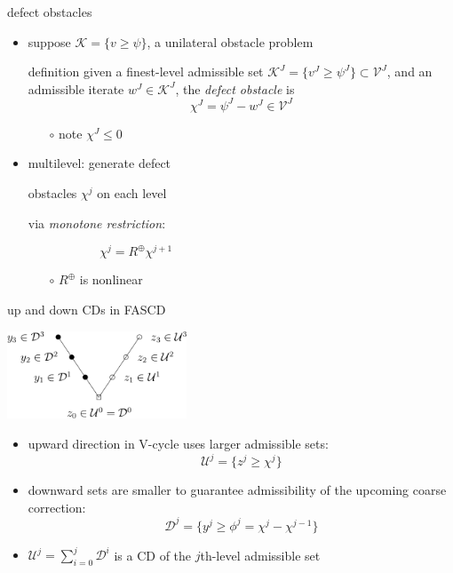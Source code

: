\documentclass[svgnames,
               hyperref={colorlinks,citecolor=DeepPink4,linkcolor=FireBrick,urlcolor=Maroon},
               usepdftitle=false]  %
               {beamer}
\newcommand{\ds}{\displaystyle}
\begin{document}
\begin{frame}{defect obstacles}

\begin{itemize}
\item suppose $\mathcal{K} = \{v \ge \psi\}$, a unilateral obstacle problem
\begin{block}{definition}
given a finest-level admissible set $\mathcal{K}^J = \{v^J\ge \psi^J\} \subset \mathcal{V}^J$, and an admissible iterate $w^J \in \mathcal{K}^J$, the \emph{defect obstacle} is
    $$\chi^J = \psi^J - w^J \in \mathcal{V}^J$$
\end{block}

    \begin{itemize}
    \item[$\circ$] note $\chi^J \le 0$
    \end{itemize}
\item multilevel: generate defect

obstacles $\chi^j$ on each level

 via \emph{monotone restriction}:

$$\chi^j = R^{\oplus} \chi^{j+1} \phantom{smdlfkaj asdfklj asdf sdfaa asddfas dsa}$$

    \begin{itemize}
    \item[$\circ$] $R^{\oplus}$ is nonlinear
    \end{itemize}
\end{itemize}

\vspace{-25mm}
\hfill \mbox{}
\end{frame}


\begin{frame}{up and down CDs in FASCD}

\begin{center}
\includegraphics[width=0.4\textwidth]{../talk-oxford/images/fascd-vcycle.png}
\end{center}

\begin{itemize}
\item upward direction in V-cycle uses larger admissible sets:
    $$\mathcal{U}^j = \{z^j \ge \chi^j\}$$
\item downward sets are smaller to guarantee admissibility of the upcoming coarse correction:
    $$\mathcal{D}^j = \{y^j \ge \phi^j=\chi^j - \chi^{j-1}\}$$
\item $\ds \mathcal{U}^j = \sum_{i=0}^j \mathcal{D}^i$ is a CD of the $j$th-level admissible set
\end{itemize}
\end{frame}
\end{document}
